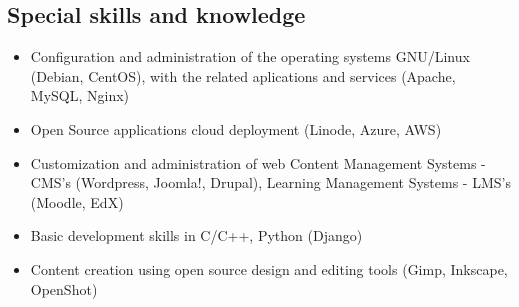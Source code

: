 \documentclass[overlapped,line,final]{res}
\begin{document}
\begin{resume}
\section{\sc Special skills and knowledge}
\vspace{0.5cm}
\begin{itemize}
	\item Configuration and administration of the operating systems GNU/Linux (Debian, CentOS), with the related aplications and services (Apache, MySQL, Nginx)
	\item Open Source applications cloud deployment (Linode, Azure, AWS) 
	\item Customization and administration of web Content Management Systems - CMS's (Wordpress, Joomla!, Drupal), Learning Management Systems - LMS's (Moodle, EdX)
	\item Basic development skills in C/C++, Python (Django)
 	\item Content creation using open source design and editing tools (Gimp, Inkscape, OpenShot)
\end{itemize}


\end{resume}
\end{document}
